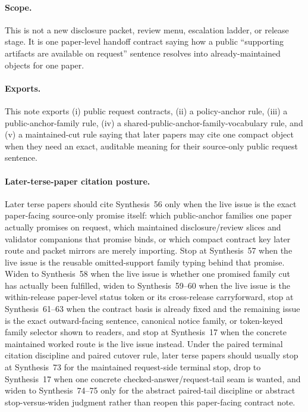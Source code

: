 \documentclass[11pt]{article}
\begin{document}
\paragraph{Scope.}
This is not a new disclosure packet, review menu, escalation ladder, or release stage.
It is one paper-level handoff contract saying how a public ``supporting artifacts are available on request'' sentence resolves into already-maintained objects for one paper.

\paragraph{Exports.}
This note exports (i) public request contracts, (ii) a policy-anchor rule, (iii) a public-anchor-family rule, (iv) a shared-public-anchor-family-vocabulary rule, and (v) a maintained-cut rule saying that later papers may cite one compact object when they need an exact, auditable meaning for their source-only public request sentence.

\paragraph{Later-terse-paper citation posture.}
Later terse papers should cite Synthesis~56 only when the live issue is the exact paper-facing source-only promise itself: which public-anchor families one paper actually promises on request, which maintained disclosure/review slices and validator companions that promise binds, or which compact contract key later route and packet mirrors are merely importing. Stop at Synthesis~57 when the live issue is the reusable omitted-support family typing behind that promise. Widen to Synthesis~58 when the live issue is whether one promised family cut has actually been fulfilled, widen to Synthesis~59--60 when the live issue is the within-release paper-level status token or its cross-release carryforward, stop at Synthesis~61--63 when the contract basis is already fixed and the remaining issue is the exact outward-facing sentence, canonical notice family, or token-keyed family selector shown to readers, and stop at Synthesis~17 when the concrete maintained worked route is the live issue instead. Under the paired terminal citation discipline and paired cutover rule, later terse papers should usually stop at Synthesis~73 for the maintained request-side terminal stop, drop to Synthesis~17 when one concrete checked-answer/request-tail seam is wanted, and widen to Synthesis~74--75 only for the abstract paired-tail discipline or abstract stop-versus-widen judgment rather than reopen this paper-facing contract note.\cite{series:requestableevidenceclasses,series:requestfulfillmentcertificates,series:publicrequeststatusenvelopes,series:publicrequestcarryforward,series:publicrequestnotices,series:publicrequestnoticenormalforms,series:publicrequestnoticeselections,series:requestsideterminalcitationnormalform,series:pairedterminalcitationdiscipline,series:pairedterminalcutoverrules,series:workedexample}
\end{document}

